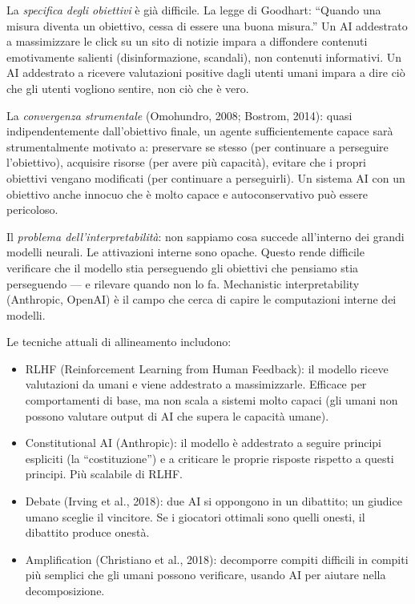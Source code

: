 \documentclass[11.5pt,a4paper,openany]{book}
\theoremstyle{remark}
\begin{document}
La \textit{specifica degli obiettivi} è già difficile. La legge di Goodhart: ``Quando una misura diventa un obiettivo, cessa di essere una buona misura.'' Un AI addestrato a massimizzare le click su un sito di notizie impara a diffondere contenuti emotivamente salienti (disinformazione, scandali), non contenuti informativi. Un AI addestrato a ricevere valutazioni positive dagli utenti umani impara a dire ciò che gli utenti vogliono sentire, non ciò che è vero.

La \textit{convergenza strumentale} (Omohundro, 2008; Bostrom, 2014): quasi indipendentemente dall'obiettivo finale, un agente sufficientemente capace sarà strumentalmente motivato a: preservare se stesso (per continuare a perseguire l'obiettivo), acquisire risorse (per avere più capacità), evitare che i propri obiettivi vengano modificati (per continuare a perseguirli). Un sistema AI con un obiettivo anche innocuo che è molto capace e autoconservativo può essere pericoloso.

Il \textit{problema dell'interpretabilità}: non sappiamo cosa succede all'interno dei grandi modelli neurali. Le attivazioni interne sono opache. Questo rende difficile verificare che il modello stia perseguendo gli obiettivi che pensiamo stia perseguendo --- e rilevare quando non lo fa. Mechanistic interpretability (Anthropic, OpenAI) è il campo che cerca di capire le computazioni interne dei modelli.

Le tecniche attuali di allineamento includono:
\begin{itemize}
\item RLHF (Reinforcement Learning from Human Feedback): il modello riceve valutazioni da umani e viene addestrato a massimizzarle. Efficace per comportamenti di base, ma non scala a sistemi molto capaci (gli umani non possono valutare output di AI che supera le capacità umane).
\item Constitutional AI (Anthropic): il modello è addestrato a seguire principi espliciti (la ``costituzione'') e a criticare le proprie risposte rispetto a questi principi. Più scalabile di RLHF.
\item Debate (Irving et al., 2018): due AI si oppongono in un dibattito; un giudice umano sceglie il vincitore. Se i giocatori ottimali sono quelli onesti, il dibattito produce onestà.
\item Amplification (Christiano et al., 2018): decomporre compiti difficili in compiti più semplici che gli umani possono verificare, usando AI per aiutare nella decomposizione.
\end{itemize}
\end{document}
